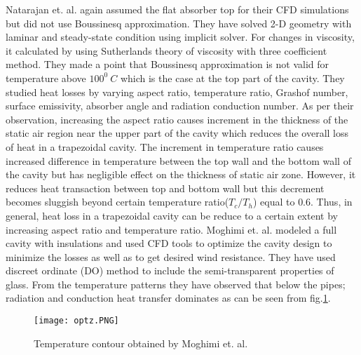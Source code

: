 Natarajan et. al.\citep{NATARAJAN2012523} again assumed the flat absorber top for their CFD simulations but did not use Boussinesq approximation. They have solved 2-D geometry with laminar and steady-state condition using implicit solver. For changes in viscosity, it calculated by using Sutherland\textquotesingle s theory of viscosity with three coefficient method. They made a point that Boussinesq approximation is not valid for temperature above $100^0\ C$ which is the case at the top part of the cavity. They studied heat losses by varying aspect ratio, temperature ratio, Grashof number, surface emissivity, absorber angle and radiation conduction number. As per their observation, increasing the aspect ratio causes increment in the thickness of the static air region near the upper part of the cavity which reduces the overall loss of heat in a trapezoidal cavity. The increment in temperature ratio causes increased difference in temperature between the top wall and the bottom wall of the cavity but has negligible effect on the thickness of static air zone. However, it reduces heat transaction between top and bottom wall but this decrement becomes sluggish beyond certain temperature ratio($T_c/T_h$) equal to $0.6$. Thus, in general, heat loss in a trapezoidal cavity can be reduce to a certain extent by increasing aspect ratio and temperature ratio. Moghimi et. al.\citep{MOGHIMI2015343} modeled a full cavity with insulations and used CFD tools to optimize the cavity design to minimize the losses as well as to get desired wind resistance. They have used discreet ordinate (DO) method to include the semi-transparent properties of glass. From the
temperature patterns they have observed that below the pipes; radiation and conduction heat transfer dominates as can be seen from fig.\ref{optz}.

\begin{figure}[H]
\begin{center}
\texttt{[image: optz.PNG]}
\caption{Temperature contour obtained by Moghimi et. al.\citep{MOGHIMI2015343}}
\end{center}
\label{optz}
\end{figure}


